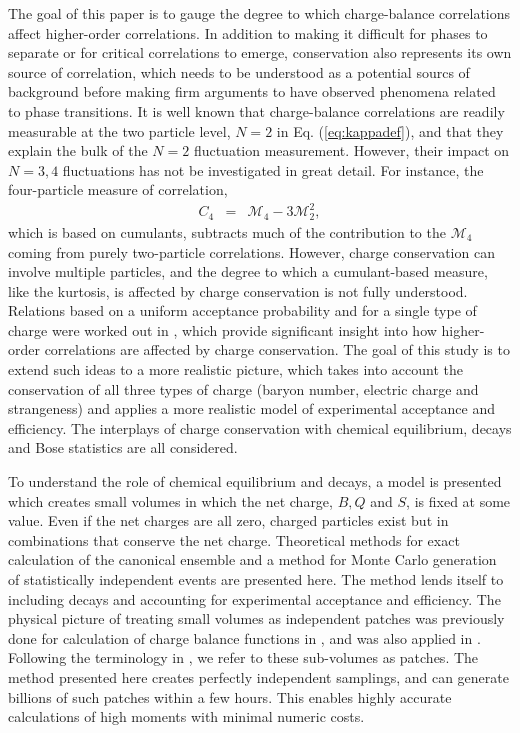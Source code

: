 The goal of this paper is to gauge the degree to which charge-balance correlations affect higher-order correlations. In addition to making it difficult for phases to separate or for critical correlations to emerge, conservation also represents its own source of correlation, which needs to be understood as a potential sourcs of background before making firm arguments to have observed phenomena related to phase transitions. It is well known that charge-balance correlations are readily measurable at the two particle level, $N=2$ in Eq. (\ref{eq:kappadef}), and that they explain the bulk of the $N=2$ fluctuation measurement. However, their impact on $N=3,4$ fluctuations has not be investigated in great detail. For instance, the four-particle measure of correlation,
\begin{eqnarray}
C_4&=&\mathcal{M}_4-3\mathcal{M}_2^2,
\end{eqnarray}
which is based on cumulants, subtracts much of the contribution to the $\mathcal{M}_4$ coming from purely two-particle correlations. However, charge conservation can involve multiple particles, and the degree to which a cumulant-based measure, like the kurtosis, is affected by charge conservation is not fully understood. Relations based on a uniform acceptance probability and for a single type of charge were worked out in \cite{Savchuk:2019xfg}, which provide significant insight into how higher-order correlations are affected by charge conservation. The goal of this study is to extend such ideas to a more realistic picture, which takes into account the conservation of all three types of charge (baryon number, electric charge and strangeness) and applies a more realistic model of experimental acceptance and efficiency. The interplays of charge conservation with chemical equilibrium, decays and Bose statistics are all considered.

To understand the role of chemical equilibrium and decays, a model is presented which creates small volumes in which the net charge, $B,Q$ and $S$, is fixed at some value. Even if the net charges are all zero, charged particles exist but in combinations that conserve the net charge. Theoretical methods for exact calculation of the canonical ensemble and a method for Monte Carlo generation of statistically independent events are presented here. The method lends itself to including decays and accounting for experimental acceptance and efficiency. The physical picture of treating small volumes as independent patches was previously done for calculation of charge balance functions in \cite{Schlichting:2010qia,Schlichting:2010na}, and was also applied in \cite{Oliinychenko:2020cmr}. Following the terminology in \cite{Oliinychenko:2020cmr}, we refer to these sub-volumes as patches. The method presented here creates perfectly independent samplings, and can generate billions of such patches within a few hours. This enables highly accurate calculations of high moments with minimal numeric costs.

